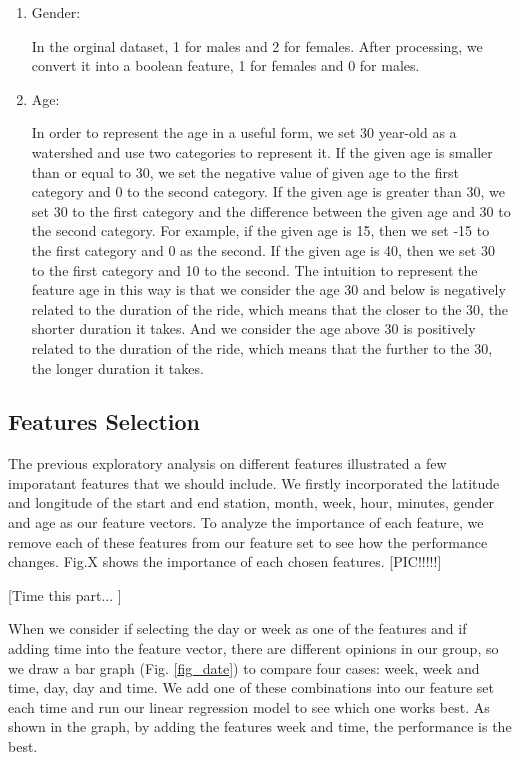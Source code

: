 \begin{enumerate}
	\item Gender:
	\par In the orginal dataset, 1 for males and 2 for females. After processing, we convert it into a boolean feature, 1 for females and 0 for males.
	\item Age:
	\par In order to represent the age in a useful form, we set 30 year-old as a watershed and use two categories to represent it. If the given age is smaller than or equal to 30, we set the negative value of given age to the first category and 0 to the second category. If the given age is greater than 30, we set 30 to the first category and the difference between the given age and 30 to the second category. For example, if the given age is 15, then we set -15 to the first category and 0 as the second. If the given age is 40, then we set 30 to the first category and 10 to the second. The intuition to represent the feature age in this way is that we consider the age 30 and below is negatively related to the duration of the ride, which means that the closer to the 30, the shorter duration it takes. And we consider the age above 30 is positively related to the duration of the ride, which means that the further to the 30, the longer duration it takes.  

\end{enumerate}


\subsection{Features Selection}
The previous exploratory analysis on different features illustrated a few imporatant features that we should include. We firstly incorporated the latitude and longitude of the start and end station, month, week, hour, minutes, gender and age as our feature vectors. To analyze the importance of each feature, we remove each of these features from our feature set to see how the performance changes. Fig.X shows the importance of each chosen features. [PIC!!!!!] \par

[Time this part... ] \par
When we consider if selecting the day or week as one of the features and if adding time into the feature vector, there are different opinions in our group, so we draw a bar graph (Fig. \ref{fig_date}) to compare four cases: week, week and time, day, day and time. We add one of these combinations into our feature set each time and run our linear regression model to see which one works best. As shown in the graph, by adding the features week and time, the performance is the best. 

